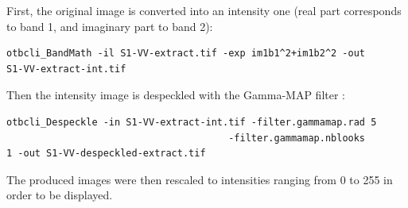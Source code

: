 First, the original image is converted into an intensity one (real part corresponds to band 1, and imaginary part to band 2):

\begin{verbatim} 
otbcli_BandMath -il S1-VV-extract.tif -exp im1b1^2+im1b2^2 -out
S1-VV-extract-int.tif 
\end{verbatim}

Then the intensity image is despeckled with the Gamma-MAP filter :

\begin{verbatim} 
otbcli_Despeckle -in S1-VV-extract-int.tif -filter.gammamap.rad 5
									   -filter.gammamap.nblooks
1 -out S1-VV-despeckled-extract.tif 
\end{verbatim}

The produced images were then rescaled to intensities ranging from 0 to 255 in order to be displayed.

